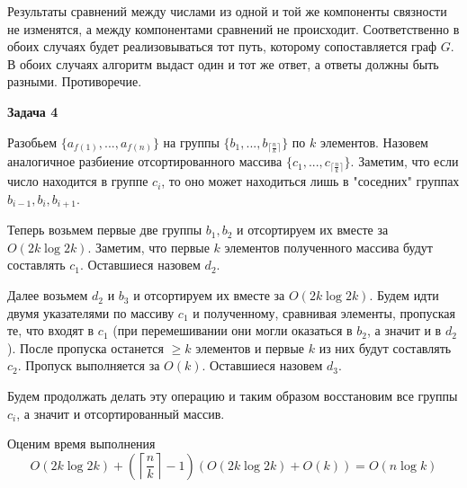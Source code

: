 \documentclass[10pt]{article}
\begin{document}
Результаты сравнений между числами из одной и той же компоненты связности не изменятся, а между компонентами сравнений не происходит. Соответственно в обоих случаях будет реализовываться тот путь, которому сопоставляется граф $G$. В обоих случаях алгоритм выдаст один и тот же ответ, а ответы должны быть разными. Противоречие.

\medskip

{\bf Задача 4}

Разобьем $\{ a_{f(1)}, ..., a_{f(n)} \}$ на группы $\{ b_1, ..., b_{\lceil \frac{n}{k} \rceil} \}$ по $k$ элементов. Назовем аналогичное разбиение отсортированного массива $\{ c_1, ..., c_{\lceil \frac{n}{k} \rceil} \}$. Заметим, что если число находится в группе $c_i$, то оно может находиться лишь в "соседних" группах $b_{i - 1}, b_{i}, b_{i + 1}$.

Теперь возьмем первые две группы $b_1, b_2$ и отсортируем их вместе за $O(2k \log{2k})$. Заметим, что первые $k$ элементов полученного массива будут составлять $c_1$. Оставшиеся назовем $d_2$.

Далее возьмем $d_2$ и $b_3$ и отсортируем их вместе за $O(2k \log{2k})$. Будем идти двумя указателями по массиву $c_1$ и полученному, сравнивая элементы, пропуская те, что входят в $c_1$ (при перемешивании они могли оказаться в $b_2$, а значит и в $d_2$). После пропуска останется $\geq k$ элементов и первые $k$ из них будут составлять $c_2$. Пропуск выполняется за $O(k)$. Оставшиеся назовем $d_3$.

Будем продолжать делать эту операцию и таким образом восстановим все группы $c_i$, а значит и отсортированный массив.

Оценим время выполнения
$$
  O(2k \log{2k}) + \left( \left\lceil \frac{n}{k} \right\rceil - 1 \right) (O(2k \log{2k}) + O(k)) = O(n \log{k})
$$
\end{document}
